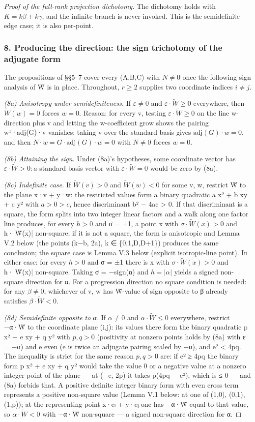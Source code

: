 \documentclass[11pt]{article}
\theoremstyle{plain}
\theoremstyle{definition}
\theoremstyle{remark}
\theoremstyle{plain}
\theoremstyle{definition}
\theoremstyle{remark}
\theoremstyle{plain}
\theoremstyle{definition}
\theoremstyle{remark}
\begin{document}
\begin{proof}[Proof of the full-rank projection dichotomy]
The dichotomy holds with $K = kβ + kγ$, and the infinite branch is never invoked. This is the semidefinite edge case; it is also per-point.

\subsubsection*{8. Producing the direction: the sign trichotomy of the adjugate form}
The propositions of §§5–7 cover every (A,B,C) with $N ≠ 0$ once the following sign analysis of W̃ is in place. Throughout, $r ≥ 2$ supplies two coordinate indices $i ≠ j$.

\emph{(8a) Anisotropy under semidefiniteness.} If $ε ≠ 0$ and $ε·\tilde{W} ≥ 0$ everywhere, then $\tilde{W}(w) = 0$ forces $w = 0$. Reason: for every v, testing $ε·\tilde{W} ≥ 0$ on the line w-direction plus v and letting the w-coefficient grow shows the pairing wᵀ·adj(G)·v vanishes; taking v over the standard basis gives $\mathrm{adj}(G)·w = 0$, and then $N·w = G·\mathrm{adj}(G)·w = 0$ with $N ≠ 0$ forces $w = 0$.

\emph{(8b) Attaining the sign.} Under (8a)'s hypotheses, some coordinate vector has $ε·\tilde{W} > 0: a$ standard basis vector with $ε·\tilde{W} = 0$ would be zero by (8a).

\emph{(8c) Indefinite case.} If $\tilde{W}(v) > 0$ and $\tilde{W}(w) < 0$ for some v, w, restrict W̃ to the plane x·v + y·w: the restricted values form a binary quadratic a x² + b xy + c y² with $a > 0 > c$, hence discriminant b² − 4ac > 0. If that discriminant is a square, the form splits into two integer linear factors and a walk along one factor line produces, for every $h > 0$ and σ = ±1, a point x with $σ·\tilde{W}(x) > 0$ and h·|W̃(x)| non-square; if it is not a square, the form is anisotropic and Lemma V.2 below (the points (k−b, 2a), k ∈ \{0,1,D,D+1\}) produces the same conclusion; the square case is Lemma V.3 below (explicit isotropic-line point). In either case: for every $h > 0$ and σ = ±1 there is x with $σ·\tilde{W}(x) > 0$ and h·|W̃(x)| non-square. Taking σ = −sign(α) and $h = |α|$ yields a signed non-square direction for α. For a progression direction no square condition is needed: for any $β ≠ 0$, whichever of v, w has W̃-value of sign opposite to β already satisfies $β·\tilde{W} < 0$.

\emph{(8d) Semidefinite opposite to α.} If $α ≠ 0$ and $α·\tilde{W} ≤ 0$ everywhere, restrict −α·W̃ to the coordinate plane (i,j): its values there form the binary quadratic p x² + e xy + q y² with $p, q > 0$ (positivity at nonzero points holds by (8a) with ε = −α) and e even (e is twice an adjugate pairing scaled by −α), and e² < 4pq. The inequality is strict for the same reason $p, q > 0$ are: if e² ≥ 4pq the binary form p x² + e xy + q y² would take the value 0 or a negative value at a nonzero integer point of the plane — at (−e, 2p) it takes p(4pq − e²), which is ≤ 0 — and (8a) forbids that. A positive definite integer binary form with even cross term represents a positive non-square value (Lemma V.1 below: at one of (1,0), (0,1), (1,p)); at the representing point x·eᵢ + y·eⱼ one has −α·W̃ equal to that value, so $α·\tilde{W} < 0$ with −α·W̃ non-square — a signed non-square direction for α.


\end{proof}
\end{document}
